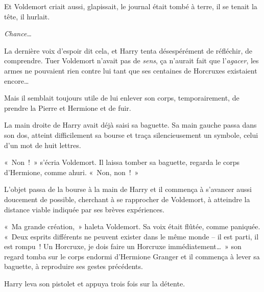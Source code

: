 Et Voldemort criait aussi, glapissait, le journal était tombé à terre, il se tenait la tête, il hurlait.

\emph{Chance…}

La dernière voix d'espoir dit cela, et Harry tenta désespérément de réfléchir, de comprendre. Tuer Voldemort n'avait pas de \emph{sens}, ça n'aurait fait que l'\emph{agacer}, les armes ne pouvaient rien contre lui tant que ses centaines de Horcruxes existaient encore…

Mais il semblait toujours utile de lui enlever son corps, temporairement, de prendre la Pierre et Hermione et de fuir.

La main droite de Harry avait déjà saisi sa baguette. Sa main gauche passa dans son dos, atteint difficilement sa bourse et traça silencieusement un symbole, celui d'un mot de huit lettres.

«~Non~!~» s'écria Voldemort. Il laissa tomber sa baguette, regarda le corps d'Hermione, comme ahuri. «~Non, non~!~»

L'objet passa de la bourse à la main de Harry et il commença à s'avancer aussi doucement de possible, cherchant à se rapprocher de Voldemort, à atteindre la distance viable indiquée par ses brèves expériences.

«~Ma grande création,~» haleta Voldemort. Sa voix était flûtée, comme paniquée. «~Deux esprits différents ne peuvent exister dans le même monde -- il est parti, il est rompu~! Un Horcruxe, je dois faire un Horcruxe immédiatement…~» son regard tomba sur le corps endormi d'Hermione Granger et il commença à lever sa baguette, à reproduire ses gestes précédents.

Harry leva son pistolet et appuya trois fois sur la détente.
